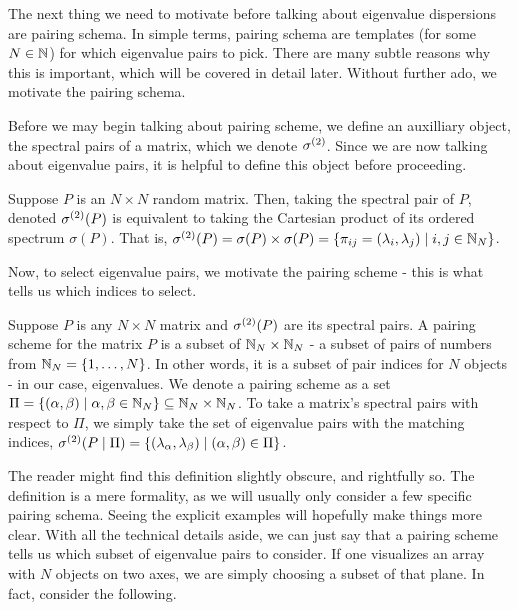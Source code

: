 The next thing we need to motivate before talking about eigenvalue dispersions are pairing schema.
In simple terms, pairing schema are templates (for some $N \in \mathbb{N}$) for which eigenvalue pairs to pick.
There are many subtle reasons why this is important, which will be covered in detail later.
Without further ado, we motivate the pairing schema.

Before we may begin talking about pairing scheme, we define an auxilliary object, the spectral pairs of a matrix, which we denote ${\sigma^{(2)}}$.
Since we are now talking about eigenvalue pairs, it is helpful to define this object before proceeding.

\begin{definition}
Suppose $P$ is an $N \times N$ random matrix. Then, taking the spectral pair of $P$, denoted ${\sigma^{(2)}}(P)$ is equivalent to taking the Cartesian product of its ordered spectrum $\sigma(P)$.
That is, ${\sigma^{(2)}}(P) = \sigma(P) \times \sigma(P) = \{{\pi_{ij}} = (\lambda_i, \lambda_j) \mid i,j \in \mathbb{N}_N\}$.
\end{definition}

Now, to select eigenvalue pairs, we motivate the pairing scheme - this is what tells us which indices to select.

\begin{definition}
Suppose $P$ is any $N \times N$ matrix and ${\sigma^{(2)}}(P)$ are its spectral pairs.
A pairing scheme for the matrix $P$ is a subset of $\mathbb{N}_N \times \mathbb{N}_N$ - a subset of pairs of numbers from $\mathbb{N}_N = \{1, \dots, N\}$.
In other words, it is a subset of pair indices for $N$ objects - in our case, eigenvalues.
We denote a pairing scheme as a set $\Pi = \{(\alpha, \beta) \mid \alpha, \beta \in \mathbb{N}_N\} \subseteq \mathbb{N}_N \times \mathbb{N}_N$.
To take a matrix's spectral pairs with respect to $\Pi$, we simply take the set of eigenvalue pairs with the matching indices,
${\sigma^{(2)}}(P \mid \Pi) = \{(\lambda_{\alpha},\lambda_{\beta}) \mid ({\alpha},{\beta}) \in \Pi\}$.
\end{definition}

The reader might find this definition slightly obscure, and rightfully so.
The definition is a mere formality, as we will usually only consider a few specific pairing schema.
Seeing the explicit examples will hopefully make things more clear.
With all the technical details aside, we can just say that a pairing scheme tells us which subset of eigenvalue pairs to consider.
If one visualizes an array with $N$ objects on two axes, we are simply choosing a subset of that plane.
In fact, consider the following.


